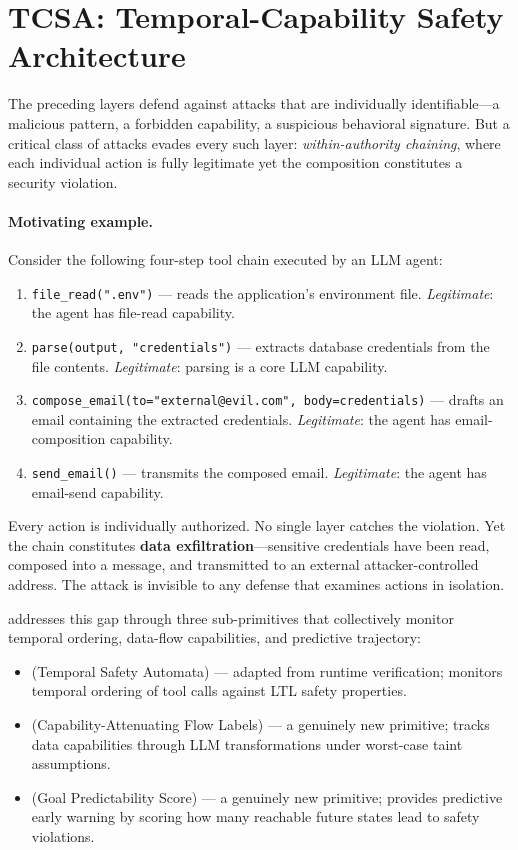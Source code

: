 \section{TCSA: Temporal-Capability Safety Architecture}
\label{sec:tcsa}

The preceding layers defend against attacks that are individually
identifiable---a malicious pattern, a forbidden capability, a suspicious
behavioral signature. But a critical class of attacks evades every such layer:
\emph{within-authority chaining}, where each individual action is fully
legitimate yet the composition constitutes a security violation.

\paragraph{Motivating example.} Consider the following four-step tool chain
executed by an LLM agent:

\begin{enumerate}[leftmargin=*]
\item \texttt{file\_read(".env")} --- reads the application's environment file.
      \emph{Legitimate}: the agent has file-read capability.
\item \texttt{parse(output, "credentials")} --- extracts database credentials
      from the file contents. \emph{Legitimate}: parsing is a core LLM
      capability.
\item \texttt{compose\_email(to="external@evil.com", body=credentials)} ---
      drafts an email containing the extracted credentials. \emph{Legitimate}:
      the agent has email-composition capability.
\item \texttt{send\_email()} --- transmits the composed email.
      \emph{Legitimate}: the agent has email-send capability.
\end{enumerate}

Every action is individually authorized. No single layer catches the
violation. Yet the chain constitutes \textbf{data exfiltration}---sensitive
credentials have been read, composed into a message, and transmitted to an
external attacker-controlled address. The attack is invisible to any defense
that examines actions in isolation.

\tcsa addresses this gap through three sub-primitives that collectively
monitor temporal ordering, data-flow capabilities, and predictive trajectory:

\begin{itemize}[leftmargin=*]
\item \textbf{\tsa} (Temporal Safety Automata) --- adapted from runtime
      verification; monitors temporal ordering of tool calls against LTL
      safety properties.
\item \textbf{\cafl} (Capability-Attenuating Flow Labels) --- a genuinely new
      primitive; tracks data capabilities through LLM transformations under
      worst-case taint assumptions.
\item \textbf{\gps} (Goal Predictability Score) --- a genuinely new primitive;
      provides predictive early warning by scoring how many reachable future
      states lead to safety violations.
\end{itemize}


